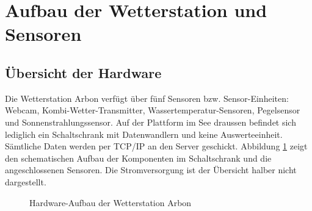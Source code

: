 \section{Aufbau der Wetterstation und Sensoren}


\subsection{Übersicht der Hardware}
Die Wetterstation Arbon verfügt über fünf Sensoren bzw. Sensor-Einheiten: Webcam, Kombi-Wetter-Transmitter, Wassertemperatur-Sensoren, Pegelsensor und Sonnenstrahlungssensor. Auf der Plattform im See draussen befindet sich lediglich ein Schaltschrank mit Datenwandlern und keine Auswerteeinheit. Sämtliche Daten werden per TCP/IP an den Server geschickt. Abbildung \ref{img:schaltschrank} zeigt den schematischen Aufbau der Komponenten im Schaltschrank und die angeschlossenen Sensoren. Die Stromversorgung ist der Übersicht halber nicht dargestellt.

\newline

\begin{figure}[ht]
	\centering
	\caption{Hardware-Aufbau der Wetterstation Arbon}
	\label{img:schaltschrank}
\end{figure}

